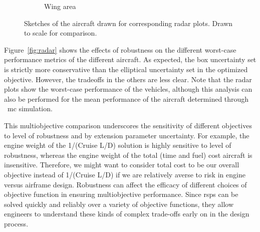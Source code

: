 \begin{figure}
\begin{center}
\begin{subfigure}{0.4\linewidth}
{}
            \caption{Wing area}
        \end{subfigure}
        \caption{Sketches of the aircraft drawn for corresponding radar plots. Drawn to scale for comparison.}
    \end{center}
\end{figure}

Figure~\ref{fig:radar} shows the effects of robustness on
the different worst-case performance metrics of the different aircraft.
As expected, the box uncertainty set is strictly more conservative than the elliptical uncertainty set
in the optimized objective. However, the tradeoffs in the others are less clear.
Note that the radar plots show the worst-case performance of the vehicles, although
this analysis can also be performed for the mean performance
of the aircraft determined through ~\gls{mc} simulation.

This multiobjective comparison underscores the sensitivity of different
objectives to level of robustness and by extension parameter uncertainty.
For example, the engine weight of the 1/(Cruise L/D) solution is highly sensitive to level of robustness,
whereas the engine weight of the total (time and fuel) cost aircraft is insensitive.
Therefore, we might want to consider total cost to be our overall objective instead of 1/(Cruise L/D)
if we are relatively averse to risk in engine versus airframe design.
Robustness can affect the efficacy of different choices of objective function in ensuring multiobjective performance.
Since \gls{rsp}s can be solved quickly and reliably over a variety of objective functions,
they allow engineers to understand these kinds of complex trade-offs early on in the design process.

